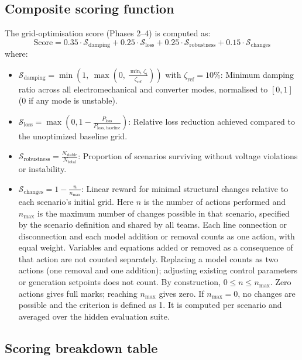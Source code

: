 \documentclass[11pt,a4paper]{article}
\begin{document}
\subsection{Composite scoring function}
The grid-optimisation score (Phases 2--4) is computed as:
\begin{equation}
  \text{Score} = 0.35 \cdot \mathcal{S}_{\text{damping}} + 0.25 \cdot \mathcal{S}_{\text{loss}} + 0.25 \cdot \mathcal{S}_{\text{robustness}} + 0.15 \cdot \mathcal{S}_{\text{changes}}
\end{equation}
where:
\begin{itemize}[leftmargin=*, itemsep=2pt]
  \item $\mathcal{S}_{\text{damping}} = \min\!\left(1,\ \max\!\left(0,\ \frac{\min_{i} \zeta_i}{\zeta_{\text{ref}}}\right)\right)$ with $\zeta_{\text{ref}} = 10\%$: Minimum damping ratio across all electromechanical and converter modes, normalised to $[0,1]$ (0 if any mode is unstable).
  \item $\mathcal{S}_{\text{loss}} = \max\left(0, 1 - \frac{P_{\text{loss}}}{P_{\text{loss, baseline}}}\right)$: Relative loss reduction achieved compared to the unoptimized baseline grid.
  \item $\mathcal{S}_{\text{robustness}} = \frac{N_{\text{stable}}}{N_{\text{total}}}$: Proportion of scenarios surviving without voltage violations or instability.
  \item $\mathcal{S}_{\text{changes}} = 1 - \frac{n}{n_{\max}}$: Linear reward for minimal structural changes relative to each scenario's initial grid. Here $n$ is the number of actions performed and $n_{\max}$ is the maximum number of changes possible in that scenario, specified by the scenario definition and shared by all teams. Each line connection or disconnection and each model addition or removal counts as one action, with equal weight. Variables and equations added or removed as a consequence of that action are not counted separately. Replacing a model counts as two actions (one removal and one addition); adjusting existing control parameters or generation setpoints does not count. By construction, $0 \le n \le n_{\max}$. Zero actions gives full marks; reaching $n_{\max}$ gives zero. If $n_{\max}=0$, no changes are possible and the criterion is defined as 1. It is computed per scenario and averaged over the hidden evaluation suite.
\end{itemize}

\subsection{Scoring breakdown table}
\end{document}
